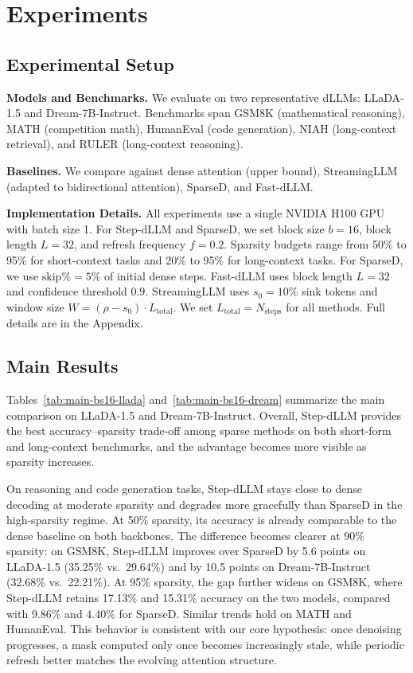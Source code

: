 \section{Experiments}

\subsection{Experimental Setup}
\textbf{Models and Benchmarks.} We evaluate on two representative dLLMs: LLaDA-1.5 and Dream-7B-Instruct. Benchmarks span GSM8K (mathematical reasoning), MATH (competition math), HumanEval (code generation), NIAH (long-context retrieval), and RULER (long-context reasoning).

\textbf{Baselines.} We compare against dense attention (upper bound), StreamingLLM (adapted to bidirectional attention), SparseD, and Fast-dLLM.

\textbf{Implementation Details.}
All experiments use a single NVIDIA H100 GPU with batch size 1. For Step-dLLM and SparseD, we set block size $b = 16$, block length $L = 32$, and refresh frequency $f = 0.2$. Sparsity budgets range from 50\% to 95\% for short-context tasks and 20\% to 95\% for long-context tasks. For SparseD, we use \(\text{skip}\% = 5\%\) of initial dense steps. Fast-dLLM uses block length $L = 32$ and confidence threshold $0.9$. StreamingLLM uses $s_0 = 10\%$ sink tokens and window size $W = (\rho - s_0) \cdot L_{\text{total}}$. We set $L_{\text{total}} = N_{\text{steps}}$ for all methods. Full details are in the Appendix.

\subsection{Main Results}

Tables~\ref{tab:main-bs16-llada} and~\ref{tab:main-bs16-dream} summarize the main comparison on LLaDA-1.5 and Dream-7B-Instruct. Overall, Step-dLLM provides the best accuracy--sparsity trade-off among sparse methods on both short-form and long-context benchmarks, and the advantage becomes more visible as sparsity increases.

On reasoning and code generation tasks, Step-dLLM stays close to dense decoding at moderate sparsity and degrades more gracefully than SparseD in the high-sparsity regime. At 50\% sparsity, its accuracy is already comparable to the dense baseline on both backbones. The difference becomes clearer at 90\% sparsity: on GSM8K, Step-dLLM improves over SparseD by 5.6 points on LLaDA-1.5 (35.25\% vs.\ 29.64\%) and by 10.5 points on Dream-7B-Instruct (32.68\% vs.\ 22.21\%). At 95\% sparsity, the gap further widens on GSM8K, where Step-dLLM retains 17.13\% and 15.31\% accuracy on the two models, compared with 9.86\% and 4.40\% for SparseD. Similar trends hold on MATH and HumanEval. This behavior is consistent with our core hypothesis: once denoising progresses, a mask computed only once becomes increasingly stale, while periodic refresh better matches the evolving attention structure.

